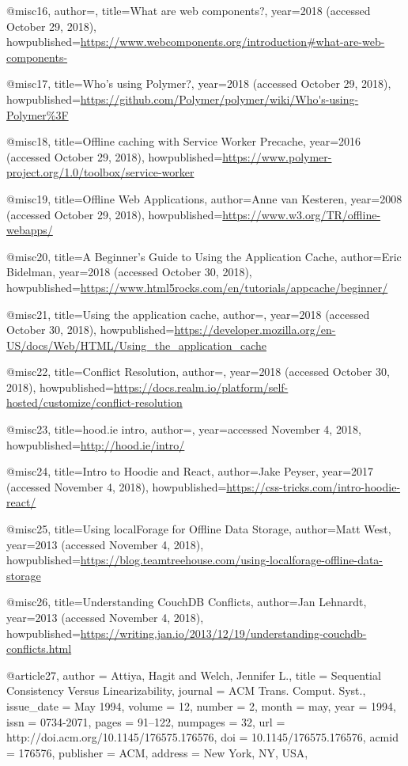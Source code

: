 @misc{16, 
author={},
title={What are web components?},
year={2018 (accessed October 29, 2018)},
howpublished={\url{https://www.webcomponents.org/introduction#what-are-web-components-}}
}

@misc{17,
title={Who's using Polymer?},
year={2018 (accessed October 29, 2018)},
howpublished={\url{https://github.com/Polymer/polymer/wiki/Who's-using-Polymer%3F}}
}

@misc{18,
title={Offline caching with Service Worker Precache},
year={2016 (accessed October 29, 2018)},
howpublished={\url{https://www.polymer-project.org/1.0/toolbox/service-worker}}
}

@misc{19,
title={Offline Web Applications},
author={Anne van Kesteren},
year={2008 (accessed October 29, 2018)},
howpublished={\url{https://www.w3.org/TR/offline-webapps/}}
}

@misc{20,
title={A Beginner's Guide to Using the Application Cache},
author={Eric Bidelman},
year={2018 (accessed October 30, 2018)},
howpublished={\url{https://www.html5rocks.com/en/tutorials/appcache/beginner/}}
}

@misc{21,
title={Using the application cache},
author={},
year={2018 (accessed October 30, 2018)},
howpublished={\url{https://developer.mozilla.org/en-US/docs/Web/HTML/Using_the_application_cache}}
}

@misc{22,
title={Conflict Resolution},
author={},
year={2018 (accessed October 30, 2018)},
howpublished={\url{https://docs.realm.io/platform/self-hosted/customize/conflict-resolution}}
}

@misc{23, 
title={hood.ie intro},
author={},
year={accessed November 4, 2018},
howpublished={\url{http://hood.ie/intro/}}
}

@misc{24,
title={Intro to Hoodie and React},
author={Jake Peyser},
year={2017 (accessed November 4, 2018)},
howpublished={\url{https://css-tricks.com/intro-hoodie-react/}}
}

@misc{25, 
title={Using localForage for Offline Data Storage},
author={Matt West},
year={2013 (accessed November 4, 2018)},
howpublished={\url{https://blog.teamtreehouse.com/using-localforage-offline-data-storage}}
}

@misc{26,
title={Understanding CouchDB Conflicts},
author={Jan Lehnardt},
year={2013 (accessed November 4, 2018)},
howpublished={\url{https://writing.jan.io/2013/12/19/understanding-couchdb-conflicts.html}}
}

@article{27,
 author = {Attiya, Hagit and Welch, Jennifer L.},
 title = {Sequential Consistency Versus Linearizability},
 journal = {ACM Trans. Comput. Syst.},
 issue_date = {May 1994},
 volume = {12},
 number = {2},
 month = may,
 year = {1994},
 issn = {0734-2071},
 pages = {91--122},
 numpages = {32},
 url = {http://doi.acm.org/10.1145/176575.176576},
 doi = {10.1145/176575.176576},
 acmid = {176576},
 publisher = {ACM},
 address = {New York, NY, USA},
} 


